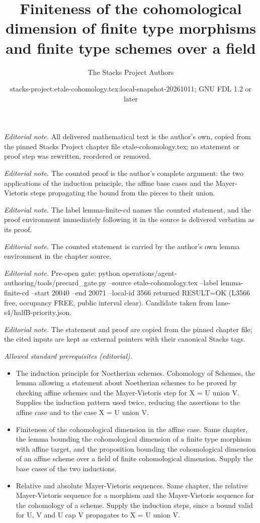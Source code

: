 \documentclass[10pt,a4paper]{amsart}
\title{Finiteness of the cohomological dimension of finite type morphisms and finite type schemes over a field}
\author{The Stacks Project Authors}
\date{stacks-project:etale-cohomology.tex:local-snapshot-20261011; GNU FDL 1.2 or later}
\theoremstyle{plain}
\theoremstyle{definition}
\theoremstyle{remark}
\numberwithin{equation}{subsection}
\begin{document}
\maketitle
\noindent\textit{Editorial note.} All delivered mathematical text is the author's own, copied from the pinned Stacks Project chapter file etale-cohomology.tex; no statement or proof step was rewritten, reordered or removed.\par\medskip
\noindent\textit{Editorial note.} The counted proof is the author's complete argument: the two applications of the induction principle, the affine base cases and the Mayer-Vietoris steps propagating the bound from the pieces to their union.\par\medskip
\noindent\textit{Editorial note.} The label lemma-finite-cd names the counted statement, and the proof environment immediately following it in the source is delivered verbatim as its proof.\par\medskip
\noindent\textit{Editorial note.} The counted statement is carried by the author's own lemma environment in the chapter source.\par\medskip
\noindent\textit{Editorial note.} Pre-open gate: python operations/agent-authoring/tools/precard\_gate.py --source etale-cohomology.tex --label lemma-finite-cd --start 20040 --end 20071 --local-id 3566 returned RESULT=OK (L3566 free, occupancy FREE, public interval clear). Candidate taken from lane-s4/halfB-priority.json.\par\medskip
\noindent\textit{Editorial note.} The statement and proof are copied from the pinned chapter file; the cited inputs are kept as external pointers with their canonical Stacks tags.\par\medskip
\noindent\textit{Allowed standard prerequisites (editorial).}\begin{itemize}
\item The induction principle for Noetherian schemes. Cohomology of Schemes, the lemma allowing a statement about Noetherian schemes to be proved by checking affine schemes and the Mayer-Vietoris step for X = U union V. Supplies the induction pattern used twice, reducing the assertions to the affine case and to the case X = U union V.
\item Finiteness of the cohomological dimension in the affine case. Same chapter, the lemma bounding the cohomological dimension of a finite type morphism with affine target, and the proposition bounding the cohomological dimension of an affine scheme over a field of finite cohomological dimension. Supply the base cases of the two inductions.
\item Relative and absolute Mayer-Vietoris sequences. Same chapter, the relative Mayer-Vietoris sequence for a morphism and the Mayer-Vietoris sequence for the cohomology of a scheme. Supply the induction steps, since a bound valid for U, V and U cap V propagates to X = U union V.
\end{itemize}\medskip
\end{document}
